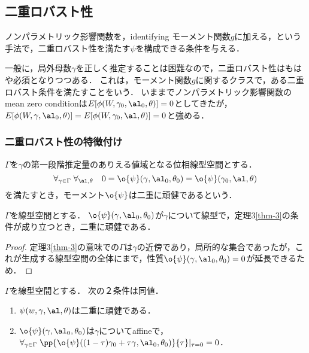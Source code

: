 \documentclass[uplatex,dvipdfmx]{jsreport}
\begin{document}
\subsection{二重ロバスト性}

\begin{tcolorbox}[colframe=ForestGreen, colback=ForestGreen!10!white,breakable,colbacktitle=ForestGreen!40!white,coltitle=black,fonttitle=\bfseries\sffamily,
title=]
    ノンパラメトリック影響関数を，identifying モーメント関数$g$に加える，という手法で，二重ロバスト性を満たす$\psi$を構成できる条件を与える．
\end{tcolorbox}

\begin{discussion}
    一般に，局外母数$\gamma$を正しく推定することは困難なので，二重ロバスト性はもはや必須となりつつある．
    これは，モーメント関数$g$に関するクラスで，ある二重ロバスト条件を満たすことをいう．
    いままでノンパラメトリック影響関数のmean zero conditionは$E[\phi(W,\gamma_0,\al_0,\theta)]=0$としてきたが，$E[\phi(W,\gamma,\al_0,\theta)]=E[\phi(W,\gamma_0,\al,\theta)]=0$と強める．
\end{discussion}

\subsubsection{二重ロバスト性の特徴付け}

\begin{definition}
    $\Gamma$を$\gamma$の第一段階推定量のありえる値域となる位相線型空間とする．
    \[\forall_{\gamma\in\Gamma}\;\forall_{\al,\theta}\quad0=\o{\psi}(\gamma,\al_0,\theta_0)=\o{\psi}(\gamma_0,\al,\theta)\]
    を満たすとき，モーメント$\o{\psi}$は二重に頑健であるという．
\end{definition}

\begin{corollary}
    $\Gamma$を線型空間とする．
    $\o{\psi}(\gamma,\al_0,\theta_0)$が$\gamma$について線型で，定理3\ref{thm-3}の条件が成り立つとき，二重に頑健である．
\end{corollary}
\begin{proof}
    定理3\ref{thm-3}の意味での$\Gamma$は$\gamma$の近傍であり，局所的な集合であったが，これが生成する線型空間の全体にまで，性質$\o{\psi}(\gamma,\al_0,\theta_0)=0$が延長できるため．
\end{proof}

\begin{theorem}[Gateaux微分のことばで述べ直す]
    $\Gamma$を線型空間とする．
    次の２条件は同値．
    \begin{enumerate}
        \item $\psi(w,\gamma,\al,\theta)$は二重に頑健である．
        \item $\o{\psi}(\gamma,\al_0,\theta_0)$は$\gamma$についてaffineで，$\forall_{\gamma\in\Gamma}\;\pp{\o{\psi}((1-\tau)\gamma_0+\tau\gamma,\al_0,\theta_0)}{\tau}|_{\tau=0}=0$．
    \end{enumerate}
\end{theorem}
\end{document}
